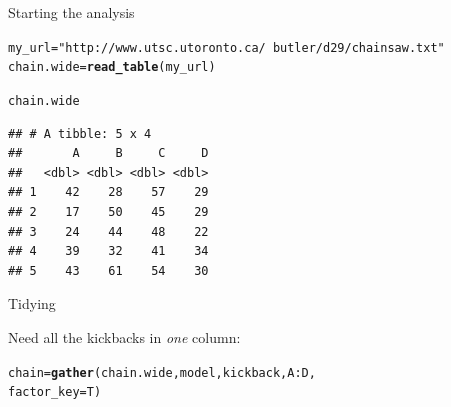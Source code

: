 \documentclass[unknownkeysallowed]{beamer}\usepackage[]{graphicx}\usepackage[]{color}
\makeatletter
\newcommand{\hlstr}[1]{\textcolor[rgb]{0.192,0.494,0.8}{#1}}%
\newcommand{\hlopt}[1]{\textcolor[rgb]{0,0,0}{#1}}%
\newcommand{\hlstd}[1]{\textcolor[rgb]{0.345,0.345,0.345}{#1}}%
\newcommand{\hlkwb}[1]{\textcolor[rgb]{0.69,0.353,0.396}{#1}}%
\newcommand{\hlkwc}[1]{\textcolor[rgb]{0.333,0.667,0.333}{#1}}%
\newcommand{\hlkwd}[1]{\textcolor[rgb]{0.737,0.353,0.396}{\textbf{#1}}}%
\newenvironment{kframe}{%
 \def\at@end@of@kframe{}%
 \ifinner\ifhmode%
  \def\at@end@of@kframe{\end{minipage}}%
  \begin{minipage}{\columnwidth}%
 \fi\fi%
 \def\FrameCommand##1{\hskip\@totalleftmargin \hskip-\fboxsep
 \colorbox{shadecolor}{##1}\hskip-\fboxsep
     \hskip-\linewidth \hskip-\@totalleftmargin \hskip\columnwidth}%
 \MakeFramed {\advance\hsize-\width
   \@totalleftmargin\z@ \linewidth\hsize
   \@setminipage}}%
 {\par\unskip\endMakeFramed%
 \at@end@of@kframe}
\newenvironment{knitrout}{}{} %
\makeatother
\begin{document}
\begin{frame}[fragile]{Starting the analysis}
  
\begin{knitrout}\footnotesize
{}\color{fgcolor}\begin{kframe}
\begin{alltt}
\hlstd{my_url}\hlkwb{=}\hlstr{"http://www.utsc.utoronto.ca/~butler/d29/chainsaw.txt"}
\hlstd{chain.wide}\hlkwb{=}\hlkwd{read_table}\hlstd{(my_url)}
\end{alltt}


{\ttfamily\noindent\itshape\color{messagecolor}{\#\# Parsed with column specification:\\\#\# cols(\\\#\#\ \  A = col\_double(),\\\#\#\ \  B = col\_double(),\\\#\#\ \  C = col\_double(),\\\#\#\ \  D = col\_double()\\\#\# )}}\begin{alltt}
\hlstd{chain.wide}
\end{alltt}
\begin{verbatim}
## # A tibble: 5 x 4
##       A     B     C     D
##   <dbl> <dbl> <dbl> <dbl>
## 1    42    28    57    29
## 2    17    50    45    29
## 3    24    44    48    22
## 4    39    32    41    34
## 5    43    61    54    30
\end{verbatim}
\end{kframe}
\end{knitrout}

  
\end{frame}

\begin{frame}[fragile]{Tidying}
  
Need all the kickbacks in \emph{one} column:

\begin{knitrout}
\color{fgcolor}\begin{kframe}
\begin{alltt}
\hlstd{chain}\hlkwb{=}\hlkwd{gather}\hlstd{(chain.wide,model,kickback,A}\hlopt{:}\hlstd{D,}
  \hlkwc{factor_key}\hlstd{=T)}
\end{alltt}
\end{kframe}
\end{knitrout}
  
  
\end{frame}
\end{document}
